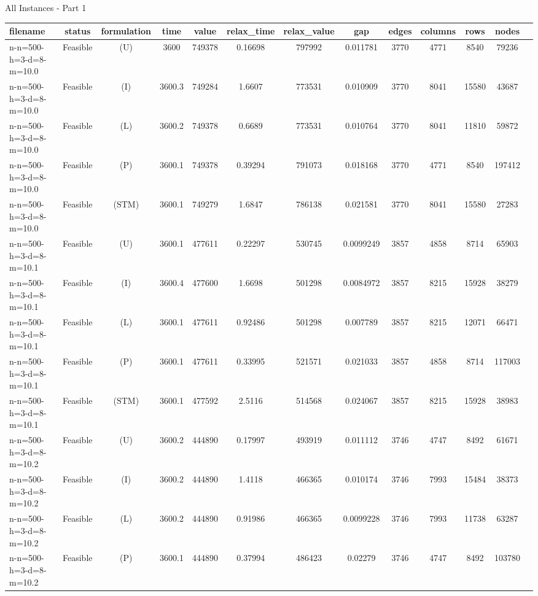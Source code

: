 \documentclass[landscape, a4paper]{article}
\newcommand{\STM}{\ensuremath{\mathrm{STM}}}
\newcommand{\Improved}{\ensuremath{\mathrm{I}}}
\newcommand{\Loose}{\ensuremath{\mathrm{L}}}
\newcommand{\Profit}{\ensuremath{\mathrm{P}}}
\newcommand{\Utility}{\ensuremath{\mathrm{U}}}
\begin{document}
\begin{center}
All Instances - Part 1

\begin{tabular}{lcccccccccccc}
filename & status & formulation & time & value & relax\_time & relax\_value & gap & edges & columns & rows & nodes & \\
\hline
n-n=500-h=3-d=8-m=10.0 & Feasible & (\Utility) & 3600 & 749378 & 0.16698 & 797992 & 0.011781 & 3770 & 4771 & 8540 & 79236 & \\
n-n=500-h=3-d=8-m=10.0 & Feasible & (\Improved) & 3600.3 & 749284 & 1.6607 & 773531 & 0.010909 & 3770 & 8041 & 15580 & 43687 & \\
n-n=500-h=3-d=8-m=10.0 & Feasible & (\Loose) & 3600.2 & 749378 & 0.6689 & 773531 & 0.010764 & 3770 & 8041 & 11810 & 59872 & \\
n-n=500-h=3-d=8-m=10.0 & Feasible & (\Profit) & 3600.1 & 749378 & 0.39294 & 791073 & 0.018168 & 3770 & 4771 & 8540 & 197412 & \\
n-n=500-h=3-d=8-m=10.0 & Feasible & (\STM) & 3600.1 & 749279 & 1.6847 & 786138 & 0.021581 & 3770 & 8041 & 15580 & 27283 & \\
n-n=500-h=3-d=8-m=10.1 & Feasible & (\Utility) & 3600.1 & 477611 & 0.22297 & 530745 & 0.0099249 & 3857 & 4858 & 8714 & 65903 & \\
n-n=500-h=3-d=8-m=10.1 & Feasible & (\Improved) & 3600.4 & 477600 & 1.6698 & 501298 & 0.0084972 & 3857 & 8215 & 15928 & 38279 & \\
n-n=500-h=3-d=8-m=10.1 & Feasible & (\Loose) & 3600.1 & 477611 & 0.92486 & 501298 & 0.007789 & 3857 & 8215 & 12071 & 66471 & \\
n-n=500-h=3-d=8-m=10.1 & Feasible & (\Profit) & 3600.1 & 477611 & 0.33995 & 521571 & 0.021033 & 3857 & 4858 & 8714 & 117003 & \\
n-n=500-h=3-d=8-m=10.1 & Feasible & (\STM) & 3600.1 & 477592 & 2.5116 & 514568 & 0.024067 & 3857 & 8215 & 15928 & 38983 & \\
n-n=500-h=3-d=8-m=10.2 & Feasible & (\Utility) & 3600.2 & 444890 & 0.17997 & 493919 & 0.011112 & 3746 & 4747 & 8492 & 61671 & \\
n-n=500-h=3-d=8-m=10.2 & Feasible & (\Improved) & 3600.2 & 444890 & 1.4118 & 466365 & 0.010174 & 3746 & 7993 & 15484 & 38373 & \\
n-n=500-h=3-d=8-m=10.2 & Feasible & (\Loose) & 3600.2 & 444890 & 0.91986 & 466365 & 0.0099228 & 3746 & 7993 & 11738 & 63287 & \\
n-n=500-h=3-d=8-m=10.2 & Feasible & (\Profit) & 3600.1 & 444890 & 0.37994 & 486423 & 0.02279 & 3746 & 4747 & 8492 & 103780 & \\

\end{tabular}
\end{center}
\end{document}
